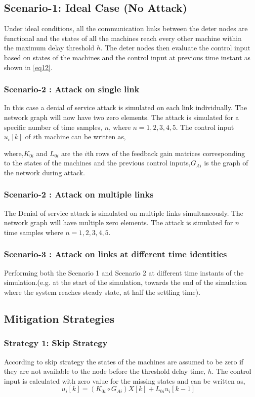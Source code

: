 \documentclass[a4paper]{article}
\begin{document}
\subsection{Scenario-1: Ideal Case (No Attack)}
Under ideal conditions, all the communication links between the deter nodes are functional and the states of all the machines reach every other machine within the maximum delay threshold $h$. The deter nodes then evaluate the control input based on states of the machines and the control input at previous time instant as shown in \eqref{eq12}. 
\subsubsection{Scenario-2 : Attack on single link}
In this case a denial of service attack is simulated on each link individually. The network graph will now have two zero elements. The attack is simulated for a specific number of time samples, $n$, where $n=1,2,3,4,5$. The control input $u_{i}[k]$ of $i$th machine can be written as,

where,$K_{0i}$ and $L_{0i}$ are the $i$th rows of the feedback gain matrices corresponding to the states of the machines and the previous control inputs,$G_{Ai}$ is the graph of the network during attack.
\subsubsection{ Scenario-2 : Attack on multiple links}
The Denial of service attack is simulated on multiple links simultaneously. The network graph will have multiple zero elements. The attack is simulated for $n$ time samples where $n = 1,2,3,4,5$.

\subsubsection{ Scenario-3 : Attack on links at different time identities}
Performing both the Scenario 1 and Scenario 2 at different time instants of the simulation.(e.g. at the start of the simulation, towards the end of the simulation where the system  reaches steady state, at half the settling time).
\subsection{ Mitigation Strategies}
\subsubsection{Strategy 1: Skip Strategy}
According to skip strategy the states of the machines  are assumed to be zero if they are not available to the node before the threshold delay time, $h$. The control input is calculated with zero value for the missing states and can be written as,
\begin{equation}
u_{i}[k] = (K_{0i}\circ G_{Ai}) X[k] + L_{0i}u_{i}[k-1] 
\end{equation}
\end{document}
